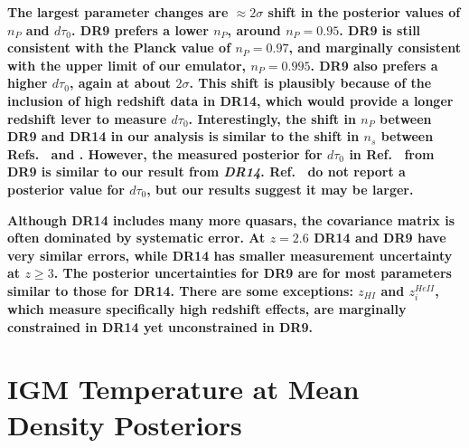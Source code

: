 \textbf{The largest parameter changes are $\approx 2\sigma$ shift in the posterior values of $n_P$ and $d\tau_0$. DR9 prefers a lower $n_P$, around $n_P = 0.95$. DR9 is still consistent with the Planck value of $n_P = 0.97$, and marginally consistent with the upper limit of our emulator, $n_P = 0.995$. DR9 also prefers a higher $d\tau_0$, again at about $2\sigma$. This shift is plausibly because of the inclusion of high redshift data in DR14, which would provide a longer redshift lever to measure $d\tau_0$. Interestingly, the shift in $n_P$ between DR9 and DR14 in our analysis is similar to the shift in $n_s$ between Refs.~\cite{2020JCAP...04..038P} and \cite{2015JCAP...11..011P}. However, the measured posterior for $d\tau_0$ in Ref.~\cite{2015JCAP...11..011P} from DR9 is similar to our result from \textit{DR14}. Ref.~\cite{2020JCAP...04..038P} do not report a posterior value for $d\tau_0$, but our results suggest it may be larger.}

\textbf{Although DR14 includes many more quasars, the covariance matrix is often dominated by systematic error. At $z=2.6$ DR14 and DR9 have very similar errors, while DR14 has smaller measurement uncertainty at $z \geq 3$. The posterior uncertainties for DR9 are for most parameters similar to those for DR14. There are some exceptions: $z_{HI}$ and $z_i^{HeII}$, which measure specifically high redshift effects, are marginally constrained in DR14 yet unconstrained in DR9.}

\section{IGM Temperature at Mean Density Posteriors}\label{sec:t0-only}


